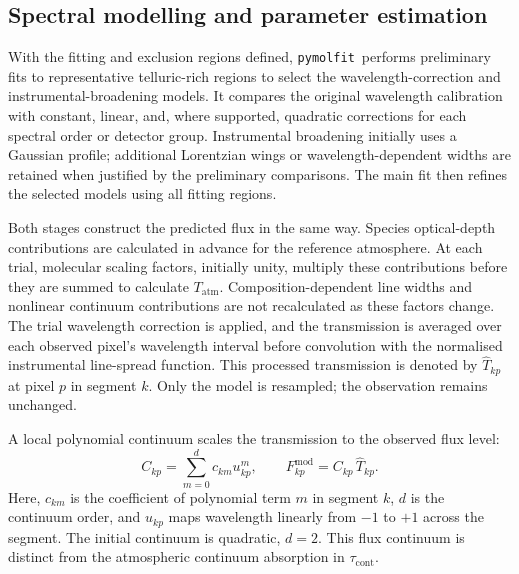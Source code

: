\documentclass{aa}
\newcommand{\pymolfit}{\texttt{pymolfit}}
\begin{document}
\subsection{Spectral modelling and parameter estimation}
With the fitting and exclusion regions defined, \pymolfit\ performs preliminary fits to representative telluric-rich regions to select the wavelength-correction and instrumental-broadening models. It compares the original wavelength calibration with constant, linear, and, where supported, quadratic corrections for each spectral order or detector group. Instrumental broadening initially uses a Gaussian profile; additional Lorentzian wings or wavelength-dependent widths are retained when justified by the preliminary comparisons. The main fit then refines the selected models using all fitting regions.

Both stages construct the predicted flux in the same way. Species optical-depth contributions are calculated in advance for the reference atmosphere. At each trial, molecular scaling factors, initially unity, multiply these contributions before they are summed to calculate \(T_{\mathrm{atm}}\). Composition-dependent line widths and nonlinear continuum contributions are not recalculated as these factors change. The trial wavelength correction is applied, and the transmission is averaged over each observed pixel's wavelength interval before convolution with the normalised instrumental line-spread function. This processed transmission is denoted by \(\widehat T_{kp}\) at pixel \(p\) in segment \(k\). Only the model is resampled; the observation remains unchanged.

A local polynomial continuum scales the transmission to the observed flux level:
\begin{equation}
    C_{kp} = \sum_{m=0}^{d} c_{km}u_{kp}^{m},
    \qquad
    F^{\mathrm{mod}}_{kp} = C_{kp}\,\widehat T_{kp}.
\end{equation}
Here, \(c_{km}\) is the coefficient of polynomial term \(m\) in segment \(k\), \(d\) is the continuum order, and \(u_{kp}\) maps wavelength linearly from \(-1\) to \(+1\) across the segment. The initial continuum is quadratic, \(d=2\). This flux continuum is distinct from the atmospheric continuum absorption in \(\tau_{\mathrm{cont}}\).
\end{document}
